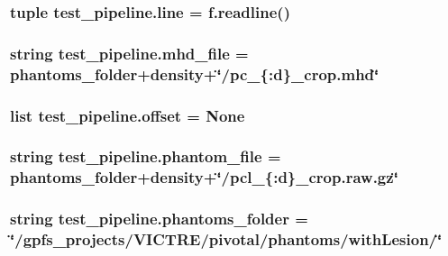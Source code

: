 \hypertarget{namespacetest__pipeline_ae549bb444ef90158d4f47e0c3f8a17d0}{
\subsubsection[{line}]{\setlength{\rightskip}{0pt plus 5cm}tuple test\-\_\-pipeline.\-line = f.\-readline()}}\label{namespacetest__pipeline_ae549bb444ef90158d4f47e0c3f8a17d0}
\hypertarget{namespacetest__pipeline_ae843f1cf40718b92abe9429113865859}{
\subsubsection[{mhd\-\_\-file}]{\setlength{\rightskip}{0pt plus 5cm}string test\-\_\-pipeline.\-mhd\-\_\-file = {\bf phantoms\-\_\-folder}+{\bf density}+\char`\"{}/pc\-\_\-\{\-:d\}\-\_\-crop.\-mhd\char`\"{}}}\label{namespacetest__pipeline_ae843f1cf40718b92abe9429113865859}
\hypertarget{namespacetest__pipeline_a0adaf87bfe7dc26e1a0d89f220fb981e}{
\subsubsection[{offset}]{\setlength{\rightskip}{0pt plus 5cm}list test\-\_\-pipeline.\-offset = None}}\label{namespacetest__pipeline_a0adaf87bfe7dc26e1a0d89f220fb981e}
\hypertarget{namespacetest__pipeline_a12b71fc499f0a1951e42b754b6cfa198}{
\subsubsection[{phantom\-\_\-file}]{\setlength{\rightskip}{0pt plus 5cm}string test\-\_\-pipeline.\-phantom\-\_\-file = {\bf phantoms\-\_\-folder}+{\bf density}+\char`\"{}/pcl\-\_\-\{\-:d\}\-\_\-crop.\-raw.\-gz\char`\"{}}}\label{namespacetest__pipeline_a12b71fc499f0a1951e42b754b6cfa198}
\hypertarget{namespacetest__pipeline_a5a533cd65e06752395913aef099f6f3a}{
\subsubsection[{phantoms\-\_\-folder}]{\setlength{\rightskip}{0pt plus 5cm}string test\-\_\-pipeline.\-phantoms\-\_\-folder = \char`\"{}/gpfs\-\_\-projects/V\-I\-C\-T\-R\-E/pivotal/phantoms/with\-Lesion/\char`\"{}}}\label{namespacetest__pipeline_a5a533cd65e06752395913aef099f6f3a}
